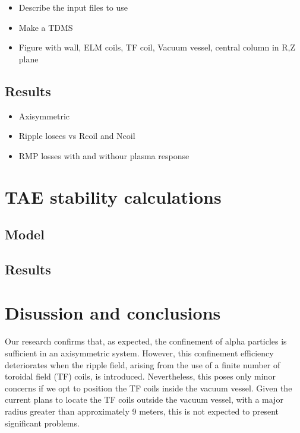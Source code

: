 \documentclass[10pt, a4paper, twoside]{article}
\begin{document}
\begin{itemize}
    \item Describe the input files to use
    \item Make a TDMS
    \item Figure with wall, ELM coils, TF coil, Vacuum vessel, central column in R,Z plane
\end{itemize}

\subsection{Results}

\begin{itemize}
    \item Axisymmetric
    \item Ripple losees vs Rcoil and Ncoil
    \item RMP losses with and withour plasma response
\end{itemize}

\section{TAE stability calculations}
\label{sec:halo_work}

\subsection{Model}

\subsection{Results}

\section{Disussion and conclusions}
\label{sec:discussion_and_conclusions}

Our research confirms that, as expected, the confinement of alpha particles is sufficient in an axisymmetric system. However, this confinement efficiency deteriorates when the ripple field, arising from the use of a finite number of toroidal field (TF) coils, is introduced. Nevertheless, this poses only minor concerns if we opt to position the TF coils inside the vacuum vessel. Given the current plans to locate the TF coils outside the vacuum vessel, with a major radius greater than approximately 9 meters, this is not expected to present significant problems.
\end{document}
